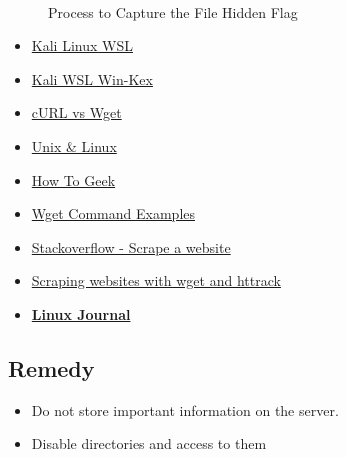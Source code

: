 \begin{figure}[!htb]
    \centering
     \quad
     \\
     \quad
    \caption[Flag 10 Method]{Process to Capture the File Hidden Flag} %
    \label{fig:flag10 method}
\end{figure}

\begin{itemize}
    \item \href{https://www.kali.org/tutorials/kali-on-the-windows-subsystem-for-linux/}{Kali Linux WSL}
    \item \href{https://www.kali.org/docs/wsl/win-kex/}{Kali WSL Win-Kex}
    \item \href{https://daniel.haxx.se/docs/curl-vs-wget.html}{cURL vs Wget}
    \item \href{https://unix.stackexchange.com/questions/47434/what-is-the-difference-between-curl-and-wget}{Unix \& Linux}
    \item \href{https://www.howtogeek.com/281663/how-to-use-wget-the-ultimate-command-line-downloading-tool/}{How To Geek}
    \item \href{https://www.webhostface.com/kb/knowledgebase/examples-using-wget/}{Wget Command Examples}
    \item \href{https://stackoverflow.com/questions/9265172/scrape-an-entire-website}{Stackoverflow - Scrape a website}
    \item \href{https://www.simonholywell.com/post/2015/09/scrape-site-with-wget-and-httrack/}{Scraping websites with wget and httrack}
    \item \href{https://www.linuxjournal.com/content/downloading-entire-web-site-wget}{\textbf{Linux Journal}}    
\end{itemize}

\subsection{Remedy}

\begin{itemize}
    \item Do not store important information on the server.
    \item Disable directories and access to them
\end{itemize}